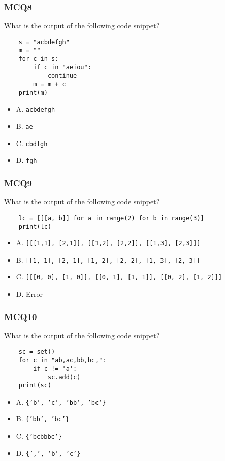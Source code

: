 \documentclass{beamer}
\begin{document}
\begin{frame}[fragile]
    \frametitle{MCQ8}
    What is the output of the following code snippet?
    \begin{verbatim}
    s = "acbdefgh"
    m = ""
    for c in s:
        if c in "aeiou":
            continue
        m = m + c
    print(m)
    \end{verbatim}
    \begin{itemize}
        \item A. \texttt{acbdefgh}
        \item B. \texttt{ae}
        \item C. \texttt{cbdfgh}
        \item D. \texttt{fgh}
    \end{itemize}
\end{frame}

\begin{frame}[fragile]
    \frametitle{MCQ9}
    What is the output of the following code snippet?
    \begin{verbatim}
    lc = [[[a, b]] for a in range(2) for b in range(3)]
    print(lc)
    \end{verbatim}
    \begin{itemize}
        \small
        \item A. \texttt{[[[1,1], [2,1]], [[1,2], [2,2]], [[1,3], [2,3]]]}
        \item B. \texttt{[[1, 1], [2, 1], [1, 2], [2, 2], [1, 3], [2, 3]]}
        \item C. \texttt{[[[0, 0], [1, 0]], [[0, 1], [1, 1]], [[0, 2], [1, 2]]]}
        \item D. Error
    \end{itemize}
\end{frame}

\begin{frame}[fragile]
    \frametitle{MCQ10}
    What is the output of the following code snippet?
    \begin{verbatim}
    sc = set()
    for c in "ab,ac,bb,bc,":
        if c != 'a':
            sc.add(c)
    print(sc)
    \end{verbatim}
    \begin{itemize}
        \item A. \texttt{\{'b', 'c', 'bb', 'bc'\}}
        \item B. \texttt{\{'bb', 'bc'\}}
        \item C. \texttt{\{'bcbbbc'\}}
        \item D. \texttt{\{',', 'b', 'c'\}}
    \end{itemize}
\end{frame}
\end{document}
